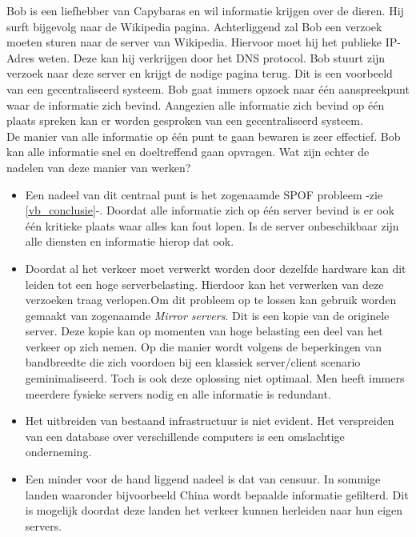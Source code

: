 Bob is een liefhebber van Capybaras en wil informatie krijgen over de dieren. Hij surft bijgevolg naar de Wikipedia pagina. Achterliggend zal Bob een verzoek moeten sturen naar de server van Wikipedia. Hiervoor moet hij het publieke IP-Adres weten. Deze kan hij verkrijgen door het DNS protocol.  Bob stuurt zijn verzoek naar deze server en krijgt de nodige pagina terug. Dit is een voorbeeld van een gecentraliseerd systeem. Bob gaat immers opzoek naar één aanspreekpunt waar de informatie zich bevind. Aangezien alle informatie zich bevind op één plaats spreken kan er worden gesproken van een gecentraliseerd systeem.\\

De manier van alle informatie op één punt te gaan bewaren is zeer effectief. Bob kan alle informatie snel en doeltreffend gaan opvragen. Wat zijn echter de nadelen van deze manier van werken?

\begin{itemize}
	\item Een nadeel van dit centraal punt is het zogenaamde SPOF probleem -zie \ref{vb_conclusie}-. Doordat alle informatie zich op één server bevind is er ook één kritieke plaats waar alles kan fout lopen. Is de server onbeschikbaar zijn alle diensten en informatie hierop dat ook.\\
	
	\item Doordat al het verkeer moet verwerkt worden door dezelfde hardware kan dit leiden tot een hoge serverbelasting. Hierdoor kan het verwerken van deze verzoeken traag verlopen.Om dit probleem op te lossen kan gebruik worden gemaakt van zogenaamde \textit{Mirror servers}. Dit is een kopie van de originele server. Deze kopie kan op momenten van hoge belasting een deel van het verkeer op zich nemen. Op die manier wordt volgens \textcite{Webb2007} de beperkingen van bandbreedte die zich voordoen bij een klassiek server/client scenario geminimaliseerd. Toch is ook deze oplossing niet optimaal. Men heeft immers meerdere fysieke servers nodig en alle informatie is redundant. \\
	
	\item Het uitbreiden van bestaand infrastructuur is niet evident. Het verspreiden van een database over verschillende computers is een omslachtige onderneming.\\
		
	\item Een minder voor de hand liggend nadeel is dat van censuur. In sommige landen waaronder bijvoorbeeld China wordt bepaalde informatie gefilterd. Dit is mogelijk doordat deze landen het verkeer kunnen herleiden naar hun eigen servers.
\end{itemize}


